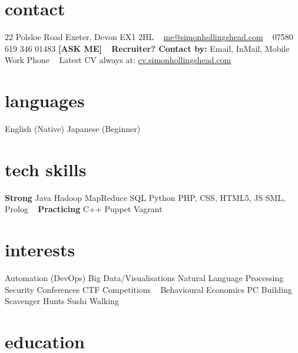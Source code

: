 \documentclass[]{friggeri-cv} %
\begin{document}

\begin{aside} %
\section{contact}
22 Polsloe Road
Exeter, Devon
EX1 2HL
~
\href{mailto:me@simonhollingshead.com}{\footnotesize{me@simonhollingshead.com}}
~
07580 619 346
01483 \textbf{[ASK ME]}
~
{\textbf{Recruiter?  Contact by:}}
Email, InMail, Mobile 
Work Phone 
~
Latest CV always at:
\href{http://cv.simonhollingshead.com/}{\footnotesize{cv.simonhollingshead.com}}
\section{languages}
English (Native)
Japanese (Beginner)
\section{tech skills}
\textbf{Strong}
Java
Hadoop MapReduce
SQL
Python
PHP, CSS, HTML5, JS
SML, Prolog
~
\textbf{Practicing}
C++
Puppet
Vagrant
\section{interests}
Automation (DevOps)
Big Data/Visualisations
{\footnotesize Natural Language Processing}
Security Conferences
CTF Competitions
~
Behavioural Economics
PC Building
Scavenger Hunts
Sushi
Walking
\end{aside}


\section{education}
\end{document}
